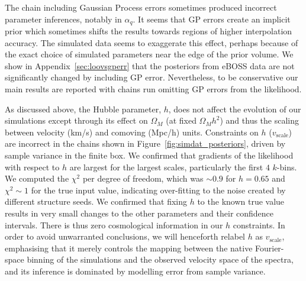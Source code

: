 The chain including Gaussian Process errors sometimes produced incorrect parameter inferences, notably in $\alpha_q$.
It seems that GP errors create an implicit prior which sometimes shifts the results towards regions of higher interpolation accuracy.
The simulated data seems to exaggerate this effect, perhaps because of the exact choice of simulated parameters near the edge of the prior volume.
We show in Appendix~\ref{sec:loovsgperr} that the posteriors from eBOSS data are not significantly changed by including GP error.
Nevertheless, to be conservative our main results are reported with chains run omitting GP errors from the likelihood.

As discussed above, the Hubble parameter, $h$, does not affect the evolution of our simulations except through its effect on $\Omega_M$ (at fixed $\Omega_M h^2$) and thus the scaling between velocity (km/s) and comoving (Mpc/h) units.
Constraints on $h$ ($v_\mathrm{scale}$) are incorrect in the chains shown in Figure~\ref{fig:simdat_posteriors}, driven by sample variance in the finite box.
We confirmed that gradients of the likelihood with respect to $h$ are largest for the largest scales, particularly the first $4$ $k$-bins.
We computed the $\chi^2$ per degree of freedom, which was $\sim 0.9$ for $h = 0.65$ and $\chi^2 \sim 1$ for the true input value, indicating over-fitting to the noise created by different structure seeds.
We confirmed that fixing $h$ to the known true value results in very small changes to the other parameters and their confidence intervals.
There is thus zero cosmological information in our $h$ constraints.
In order to avoid unwarranted conclusions, we will henceforth relabel $h$ as $v_\mathrm{scale}$, emphasising that it merely controls the mapping between the native Fourier-space binning of the simulations and the observed velocity space of the spectra, and its inference is dominated by modelling error from sample variance.